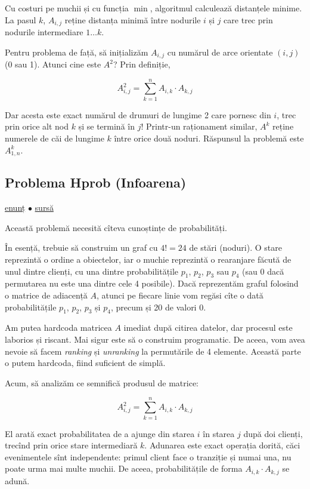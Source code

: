 \documentclass[../main.tex]{subfiles}
\begin{document}
Cu costuri pe muchii și cu funcția $\min$, algoritmul calculează distanțele minime. La pasul $k$, $A_{i,j}$ reține distanța minimă între nodurile $i$ și $j$ care trec prin nodurile intermediare $1 \dots k$.

Pentru problema de față, să inițializăm $A_{i,j}$ cu numărul de arce orientate $(i, j)$ (0 sau 1). Atunci cine este $A^2$? Prin definiție,

$$A^2_{i,j} = \sum_{k=1}^{n} A_{i,k} \cdot A_{k,j}$$

Dar acesta este exact numărul de drumuri de lungime 2 care pornesc din $i$, trec prin orice alt nod $k$ și se termină în $j$! Printr-un raționament similar, $A^k$ reține numerele de căi de lungime $k$ între orice două noduri. Răspunsul la problemă este $A^k_{1,n}$.

\subsection{Problema Hprob (Infoarena)}
\label{problem:hprob}

\href{https://www.infoarena.ro/problema/hprob}{enunț}
$\bullet$
\hyperref[code:hprob]{sursă}

Această problemă necesită cîteva cunoștințe de probabilități.

În esență, trebuie să construim un graf cu $4! = 24$ de stări (noduri). O stare reprezintă o ordine a obiectelor, iar o muchie reprezintă o rearanjare făcută de unul dintre clienți, cu una dintre probabilitățile $p_1$, $p_2$, $p_3$ sau $p_4$ (sau 0 dacă permutarea nu este una dintre cele 4 posibile). Dacă reprezentăm graful folosind o matrice de adiacență $A$, atunci pe fiecare linie vom regăsi cîte o dată probabilitățile $p_1$, $p_2$, $p_3$ și $p_4$, precum și 20 de valori 0.

Am putea hardcoda matricea $A$ imediat după citirea datelor, dar procesul este laborios și riscant. Mai sigur este să o construim programatic. De aceea, vom avea nevoie să facem \textit{ranking} și \textit{unranking} la permutările de 4 elemente. Această parte o putem hardcoda, fiind suficient de simplă.

Acum, să analizăm ce semnifică produsul de matrice:

$$A^2_{i,j} = \sum_{k=1}^{n} A_{i,k} \cdot A_{k,j}$$

El arată exact probabilitatea de a ajunge din starea $i$ în starea $j$ după doi clienți, trecînd prin orice stare intermediară $k$. Adunarea este exact operația dorită, căci evenimentele sînt independente: primul client face o tranziție și numai una, nu poate urma mai multe muchii. De aceea, probabilitățile de forma $A_{i,k} \cdot A_{k,j}$ se adună.
\end{document}
